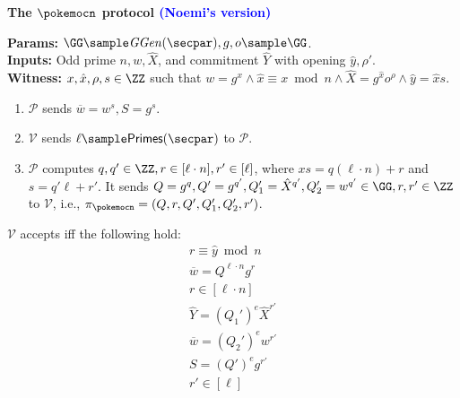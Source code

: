 \begin{mdframed}
\begin{center}
    \textbf{The $\pokemocn$ protocol \textcolor{blue}{(Noemi's version)}}
\end{center}
\textbf{Params:} $\GG \sample\mathit{GGen}(\secpar),g,o\sample\GG$.\hfill\\
\textbf{Inputs:} Odd prime $n, w, \hat{X}$, and commitment $\hat{Y}$ with opening $\hat{y}, \rho'$. \hfill\\
\textbf{Witness:} $x,\hat{x},\rho,s \in \ZZ$ such that $w = g^x \land \hat{x} \equiv x \bmod{n} \land \hat{X} = g^{\hat{x}} o^{\rho} \land \hat{y} = \hat{x} s$.
\begin{enumerate}
    \item $\mathcal{P}$ sends $\overline{w} = w^s, S = g^s$.
    \item $\mathcal{V}$ sends $\ell \sample\mathsf{Primes}(\secpar)$ to $\mathcal{P}$.
    \item $\mathcal{P}$ computes $q,q'\in\ZZ, r\in[\ell \cdot n],r' \in [\ell]$, where $xs=q(\ell \cdot n)+r$ and $s = q' \ell + r'$. It sends $Q=g^q, Q' = g^{q'}, Q_1' = \hat{X}^{q'}, Q_2' = w^{q'} \in\GG,r, r'\in\ZZ$ to $\mathcal{V}$, i.e., $\pi_{\pokemocn}=(Q,r,Q',Q_1',Q_2',r')$.
\end{enumerate}
$\mathcal{V}$ accepts iff the following hold:
\begin{align*}
    r \equiv \hat{y} \bmod{n}\\
    \overline{w} = Q^{\ell \cdot n} g^r\\
    r \in [\ell \cdot n]\\
    \hat{Y} = (Q_1')^e \hat{X}^{r'}\\
    \overline{w} = (Q_2')^e w^{r'}\\
    S = (Q')^e g^{r'}\\
    r' \in [\ell]
\end{align*}
\end{mdframed}
 